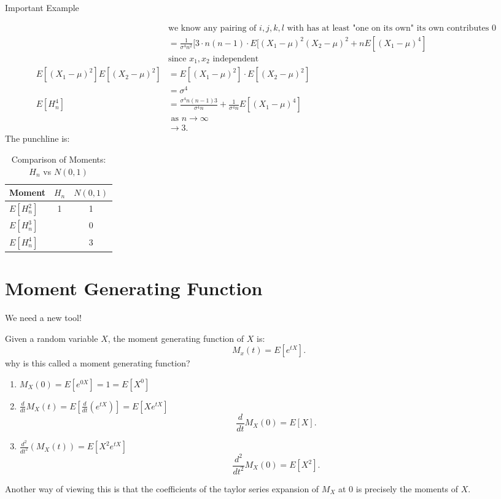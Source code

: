 \documentclass[a4paper]{article}
\begin{document}
\begin{note}{Important Example}
\begin{enumerate}
\begin{align*}
                   &\text{we know any pairing of $i,j,k,l$ with has at least "one on its own" its own contributes $0$ } \\
                   &= \frac{1}{\sigma^{4}n^{2}} [3 \cdot n (n-1) \cdot E[(X_1 - \mu)^{2} (X_2 - \mu)^{2} + n E[(X_1 - \mu)^{4}] \\
                   &\text{since $x_1,x_2$ independent}\\
        E[(X_1- \mu)^{2}]E[(X_2 - \mu)^{2}] &= E[(X_1 -\mu)^{2}] \cdot E[(X_2 -\mu)^{2}] \\
                                            &= \sigma^{4} \\
        E[H_n^{4}] &= \frac{\sigma^{4} n(n-1)3}{\sigma^{4}n} + \frac{1}{\sigma^{4}n} E[(X_1 - \mu)^{4} ] \\
                   &\text{ as $n \to \infty$} \\
                   &\to 3
      .\end{align*}
      The punchline is:
\begin{table}[h!]
\centering
\begin{tabular}{lcc}
\toprule
Moment & $H_n$ & $N(0,1)$ \\
\midrule
$E[H_n^2]$ & 1 & 1 \\
$E[H_n^3]$ & \to 0 & 0 \\
$E[H_n^4]$ & \to 3 & 3 \\
\bottomrule
\end{tabular}
\caption{Comparison of Moments: $H_n$ vs $N(0,1)$}
\end{table}
  \end{enumerate}
\end{note}


\section{Moment Generating Function}
We need a new tool! 
\begin{definition}
  Given a random variable $X$, the moment generating function of  $X$ is:
   \[
     M_{x}(t) = E[e^{tX}]
  .\] 
  why is this called a moment generating function?
  \begin{enumerate}
    \item $M_X(0) = E[e^{0X}] = 1 = E[X^{0}]$ 
    \item $\frac{d}{dt}M_X(t) = E[\frac{d}{dt}\left( e^{tX} \right)] =E[Xe^{tX}]$
      \[
        \frac{d}{dt} M_X(0) = E[X]
      .\] 
    \item $\frac{d^{2}}{dt^{2}} (M_X(t)) = E[X^{2}e^{tX}]$ 
      \[
        \frac{d^{2}}{dt^{2}} M_X\left( 0 \right) = E[X^{2}]
      .\]
  \end{enumerate}
  Another way of viewing this is that the coefficients of the taylor series expansion of $M_X$ at 0 is precisely the moments of  $X$.
\end{definition}
\end{document}
